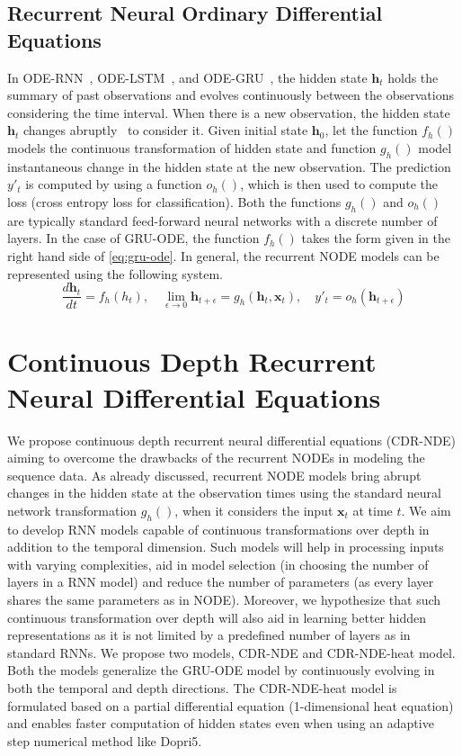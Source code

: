 \documentclass{article} %
\newcommand{\bx}{\mathbf{x}}
\newcommand{\bh}{\mathbf{h}}
\begin{document}
\subsection{Recurrent Neural Ordinary Differential Equations}
In ODE-RNN~\citep{odernn}, ODE-LSTM~\citep{lechner2020learning}, and ODE-GRU~\citep{de2019gru},  the hidden state $\bh_t$ holds the summary of past observations and evolves continuously between the observations considering the time interval. When there is a new observation, the hidden state $\bh_t$ changes abruptly~\citep{spatio-temp} to consider it. Given initial state $\bh_0$, let the function $f_h()$ models the continuous transformation of hidden state and function $g_h()$ model instantaneous change in the hidden state at the new observation. The prediction $y'_t$ is computed by using a function $o_h()$, which is then used to compute the loss (cross entropy loss for classification). Both the functions $g_h()$ and $o_h()$ are typically standard feed-forward neural networks with a discrete number of layers.  In the case of GRU-ODE, the function $f_h()$ takes the form given in the right hand side of \eqref{eq:gru-ode}. In general, the recurrent NODE models can be represented using the following system.
\begin{equation}
    \frac{d\bh_t}{dt} = f_h(h_t) , \quad \lim_{\epsilon\to0} \bh_{t+\epsilon} = g_h(\bh_t,\bx_t)  , \quad  y'_t = o_h(\bh_{t+\epsilon})
\end{equation}

\section{Continuous Depth Recurrent Neural Differential Equations}
We propose continuous depth recurrent neural differential equations (CDR-NDE) aiming to overcome the drawbacks of the recurrent NODEs in modeling the sequence data. As already discussed, recurrent NODE models bring abrupt changes in  the hidden state at the observation times using the standard neural network transformation $g_h()$, when it considers the input $\bx_t$ at time $t$. We aim to develop RNN models capable of continuous transformations over depth in addition to the temporal dimension. Such models will  help in processing inputs with varying complexities,  aid in model selection (in choosing the number of layers in a RNN model) and reduce the number of parameters (as every layer shares  the same parameters as in NODE). Moreover, we hypothesize that such continuous transformation over depth will also aid in learning better hidden representations as it is not limited by a predefined number of layers as in standard RNNs. 
We propose two models, CDR-NDE and CDR-NDE-heat model. Both the models generalize the GRU-ODE model by continuously evolving in both the temporal  and depth directions. The CDR-NDE-heat model is formulated based on a partial differential equation (1-dimensional heat equation) and enables faster computation of hidden states even when using an adaptive step numerical method like Dopri5.
\end{document}

